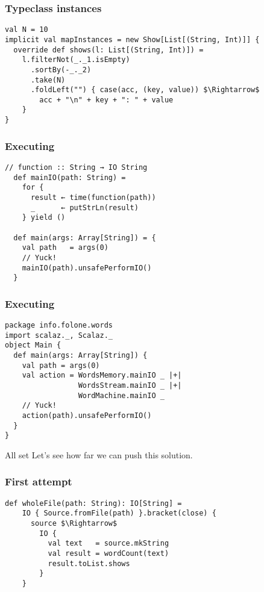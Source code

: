 \documentclass{beamer}
\begin{document}
\begin{frame}[fragile]
\frametitle{Typeclass instances}
\begin{lstlisting}[mathescape]
val N = 10
implicit val mapInstances = new Show[List[(String, Int)]] {
  override def shows(l: List[(String, Int)]) =
    l.filterNot(_._1.isEmpty)
      .sortBy(-_._2)
      .take(N)
      .foldLeft("") { case(acc, (key, value)) $\Rightarrow$
        acc + "\n" + key + ": " + value
    }
}
\end{lstlisting}
\end{frame}

\begin{frame}[fragile]
\frametitle{Executing}
\begin{lstlisting}[mathescape]
  // function :: String → IO String
  def mainIO(path: String) =
    for {
      result ← time(function(path))
      _      ← putStrLn(result)
    } yield ()

  def main(args: Array[String]) = {
    val path   = args(0)
    // Yuck!
    mainIO(path).unsafePerformIO()
  }
\end{lstlisting}
\end{frame}

\begin{frame}[fragile]
\frametitle{Executing}
\begin{lstlisting}[mathescape]
package info.folone.words
import scalaz._, Scalaz._
object Main {
  def main(args: Array[String]) {
    val path = args(0)
    val action = WordsMemory.mainIO _ |+|
                 WordsStream.mainIO _ |+|
                 WordMachine.mainIO _
    // Yuck!
    action(path).unsafePerformIO()
  }
}
\end{lstlisting}
\end{frame}


\begin{frame}{All set}
  Let's see how far we can push this solution.
\end{frame}

\begin{frame}[fragile]
\frametitle{First attempt}
\begin{lstlisting}[mathescape]
  def wholeFile(path: String): IO[String] =
    IO { Source.fromFile(path) }.bracket(close) {
      source $\Rightarrow$
        IO {
          val text   = source.mkString
          val result = wordCount(text)
          result.toList.shows
        }
    }
\end{lstlisting}
\end{frame}
\end{document}
